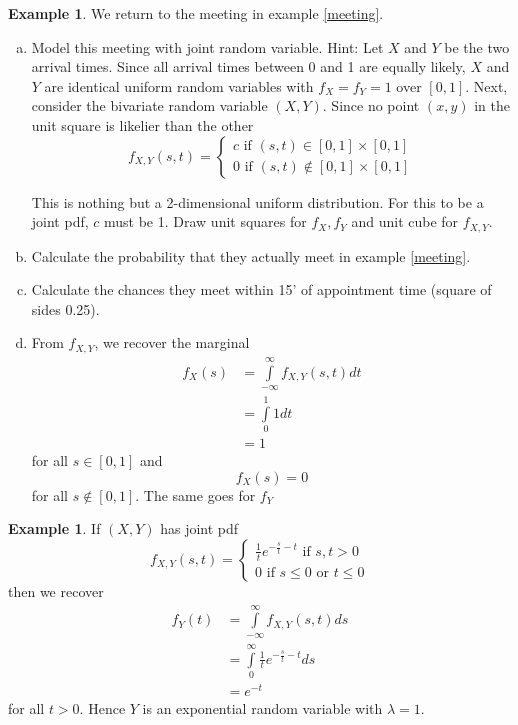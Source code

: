 \documentclass[12pt]{amsart}
\theoremstyle{definition}
\newtheorem{example}[theorem]{Example}
\begin{document}
\begin{example} We return to the meeting in example \ref{meeting}.
\begin{enumerate}[a.]
\item Model this meeting with joint random variable. Hint: Let $X$ and $Y$ be the two arrival times. Since all arrival times between 0 and 1 are equally likely, $X$ and $Y$ are identical uniform random variables with $f_X = f_Y = 1$ over $[0,1]$. Next, consider the bivariate random variable $(X, Y)$. Since no point $(x, y)$ in the unit square is likelier than the other
$$f_{X, Y}(s, t) = \begin{cases} c \text{ if } (s, t) \in [0, 1] \times [0, 1] \\ 0 \text{ if } (s, t) \nin [0, 1] \times [0, 1] \end{cases}$$

This is nothing but a 2-dimensional uniform distribution. For this to be a joint pdf, $c$ must be 1. Draw unit squares for $f_X, f_Y$ and unit cube for $f_{X, Y}$.
\item Calculate the probability that they actually meet in example \ref{meeting}.
\item Calculate the chances they meet within 15' of appointment time (square of sides 0.25).
\item From $f_{X, Y}$, we recover the marginal
\begin{align*}
f_X(s) & = \int\limits^{\infty}_{-\infty} f_{X, Y}(s, t) dt \\
 & = \int\limits^1_0 1dt \\
 & = 1
\end{align*}
for all $s \in [0, 1]$ and
$$f_X(s) = 0$$
for all $s \nin [0, 1]$. The same goes for $f_Y$
\end{enumerate}
\end{example}

\begin{example} If $(X, Y)$ has joint pdf
$$f_{X, Y}(s, t) = \begin{cases} \frac{1}{t}e^{-\frac{s}{t} - t} \text{ if } s, t > 0 \\ 0 \text{ if } s \leq 0 \text{ or } t \leq 0 \end{cases}$$
then we recover
\begin{align*}
f_Y(t) & = \int\limits_{-\infty}^{\infty} f_{X, Y}(s, t)ds \\
 & = \int\limits_0^{\infty}\frac{1}{t}e^{-\frac{s}{t} -t} ds \\
 & = e^{-t}
\end{align*}
for all $t > 0$. Hence $Y$ is an exponential random variable with $\lambda = 1$.
\end{example}
\end{document}
